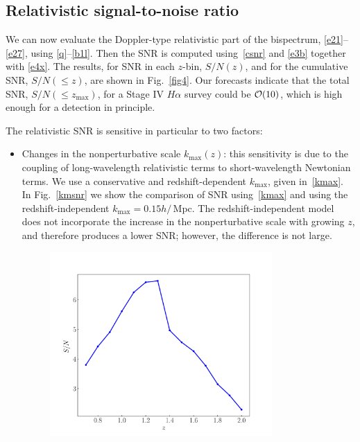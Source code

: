 \subsection{Relativistic signal-to-noise ratio}
%
%
We can now evaluate the Doppler-type relativistic part of the bispectrum, \eqref{e21}--\eqref{e27}, using \eqref{q}--\eqref{b1l}. 
Then the SNR is computed using~\eqref{csnr}  and \eqref{e3b} together with \eqref{e4x}.
The results, for SNR in each $z$-bin, $S/N(z)$, and for the cumulative SNR, $S/N(\leq z)$, are shown in Fig.~\ref{fig4}.
Our forecasts indicate that the total SNR, $S/N(\leq z_{\mathrm{max}})$, for a Stage IV $H\alpha$  survey could be ${\cal O}(10)$, which  is high enough for a detection in principle.

The relativistic SNR is sensitive in particular to two factors:
\begin{itemize}
\item 
Changes in the nonperturbative scale  $k_{\mathrm{max}}(z)$: this sensitivity is due to the coupling of long-wavelength relativistic terms to short-wavelength Newtonian terms. 
We use a conservative and redshift-dependent $k_{\mathrm{max}}$, given in~\eqref{kmax}. In  Fig.~\ref{kmsnr}
we show the comparison of SNR using~\eqref{kmax} and using the redshift-independent $k_{\mathrm{max}}=0.15h/\,$Mpc. The redshift-independent model does not incorporate  the increase in the nonperturbative scale with growing $z$, and therefore produces a lower SNR; however, the difference is not large.
\begin{figure}[!ht]
\centering
\includegraphics[width=0.8\textwidth]{fig/snrDoppler-eps-converted-to}

\end{figure}
\end{itemize}
